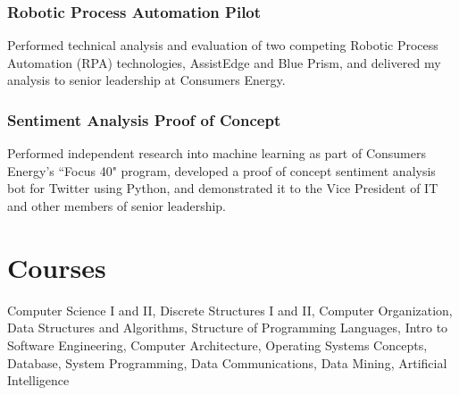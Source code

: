 \documentclass{article}
\begin{document}
    \subsubsection{Robotic Process Automation Pilot}
			\begin{addmargin}[1em]{0em}
				Performed technical analysis and evaluation of two competing Robotic Process Automation (RPA) technologies, AssistEdge and Blue Prism, and delivered my analysis to senior leadership at Consumers Energy.
			\end{addmargin}

    \subsubsection{Sentiment Analysis Proof of Concept}
			\begin{addmargin}[1em]{0em}
				Performed independent research into machine learning as part of Consumers Energy's ``Focus 40" program, developed a proof of concept sentiment analysis bot for Twitter using Python, and demonstrated it to the Vice President of IT and other members of senior leadership.
			\end{addmargin}

  	\section*{Courses}
  		\begin{addmargin}[1em]{0em}
  			Computer Science I and II, Discrete Structures I and II, Computer Organization, Data Structures and Algorithms, Structure of Programming Languages, Intro to Software Engineering, Computer Architecture, Operating Systems Concepts, Database, System Programming, Data Communications, Data Mining, Artificial Intelligence
  		\end{addmargin}

\end{document}
